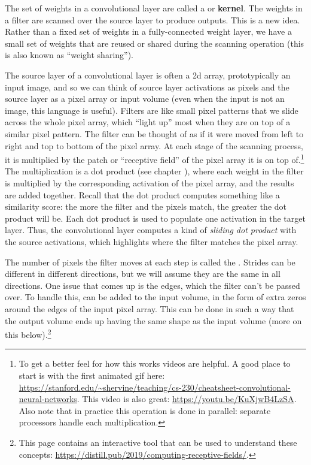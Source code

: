 The set of weights in a convolutional layer are called a  or \textbf{kernel}. The weights in a filter are scanned over the source layer to produce outputs. This is a new idea. Rather than a fixed set of weights in a fully-connected weight layer, we have a small set of weights that are reused or shared during the scanning operation (this is also known as ``weight sharing'').

 The source layer of a convolutional layer is often a 2d array, prototypically an input image, and so we can think of source layer activations as pixels and the source layer as a pixel array or input volume (even when the input is not an image, this language is useful). Filters are like small pixel patterns that we slide across the whole pixel array, which ``light up'' most when they are on top of a similar pixel pattern. The filter can be thought of as if it were moved from left to right and top to bottom of the pixel array. At each stage of the scanning process, it is multiplied by the patch or ``receptive field''  of the pixel array it is on top of.\footnote{To get a better feel for how this works videos are helpful. A good place  to start is with the first animated gif here: \url{https://stanford.edu/~shervine/teaching/cs-230/cheatsheet-convolutional-neural-networks}. This video is also great: \url{https://youtu.be/KuXjwB4LzSA}. Also note that in practice this operation is done in parallel: separate processors handle each multiplication.} The multiplication is a dot product (see chapter ), where each weight in the filter is multiplied by the corresponding activation of the pixel array, and the results are added together. Recall that the dot product computes something like a similarity score: the more the filter and the pixels match, the greater the dot product will be. Each dot product is used to populate one activation in the target layer. Thus, the convolutional layer computes a kind of \emph{sliding dot product} with the source activations, which highlights where the filter matches the pixel array.
 
 The number of pixels the filter moves at each step is called the . Strides can be different in different directions, but we will assume they are the same in all directions. One issue that comes up is the edges, which the filter can't be passed over. To handle this,  can be added to the input volume, in the form of extra zeros around the edges of the input pixel array. This can be done in such a way that the output volume ends up having the same shape as the input volume (more on this below).\footnote{This page contains an interactive tool that can be used to understand these concepts: \url{https://distill.pub/2019/computing-receptive-fields/}.}

